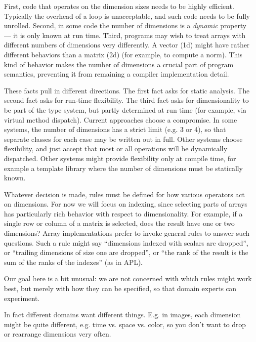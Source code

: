 First, code that operates on the dimension
sizes needs to be highly efficient. Typically the overhead of a loop is
unacceptable, and such code needs to be fully unrolled. Second, in some
code the number of dimensions is a \emph{dynamic} property --- it is
only known at run time. Third, programs may wish to treat arrays with
different numbers of dimensions very differently. A vector (1d) might
have rather different behaviors than a matrix (2d) (for example, to
compute a norm). This kind of
behavior makes the number of dimensions a crucial part of program
semantics, preventing it from remaining a compiler implementation detail.

These facts pull in different directions. The first fact asks for static
analysis. The second fact asks for run-time flexibility. The third fact asks
for dimensionality to be part of the type system, but partly determined
at run time (for example, via virtual method dispatch). Current approaches
choose a compromise. In some systems, the number of dimensions has a strict
limit (e.g. 3 or 4), so that separate classes for each case may be written
out in full. Other systems choose flexibility, and just accept that most
or all operations will be dynamically dispatched. Other systems might
provide flexibility only at compile time, for example a template library
where the number of dimensions must be statically known.



Whatever decision is made, rules must be defined for how various operators
act on dimensions. For now we will focus on indexing, since selecting
parts of arrays has particularly rich behavior with respect to
dimensionality. For example, if a single row or column of a matrix is
selected, does the result have one or two dimensions? Array implementations
prefer to invoke general rules to answer such questions. Such a rule might
say ``dimensions indexed with scalars are dropped'', or ``trailing
dimensions of size one are dropped'', or ``the rank of the result
is the sum of the ranks of the indexes'' (as in APL).

Our goal here is a bit unusual: we are not concerned with which rules
might work best, but merely with how they can be specified, so that
domain experts can experiment.

In fact different domains want different things. E.g. in images, each
dimension might be quite different, e.g. time vs. space vs. color,
so you don't want to drop or rearrange dimensions very often.

